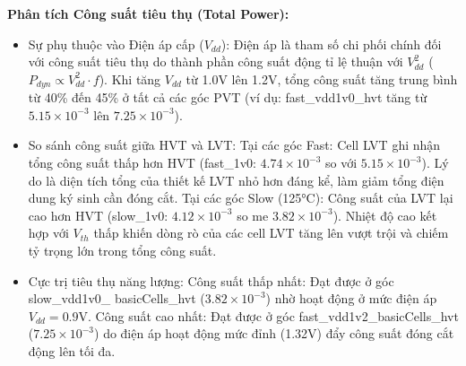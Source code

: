 \documentclass[12pt,a4paper,oneside]{book}
\begin{document}
\textbf{Phân tích Công suất tiêu thụ (Total Power):}
\begin{itemize}
    \item Sự phụ thuộc vào Điện áp cấp ($V_{dd}$): Điện áp là tham số chi phối chính đối với công suất tiêu thụ do thành phần công suất động tỉ lệ thuận với $V_{dd}^2$ ($P_{dyn} \propto V_{dd}^2 \cdot f$). Khi tăng $V_{dd}$ từ 1.0V lên 1.2V, tổng công suất tăng trung bình từ 40\% đến 45\% ở tất cả các góc PVT (ví dụ: fast\_vdd1v0\_hvt tăng từ $5.15 \times 10^{-3}$ lên $7.25 \times 10^{-3}$).
    \item So sánh công suất giữa HVT và LVT: Tại các góc Fast: Cell LVT ghi nhận tổng công suất thấp hơn HVT (fast\_1v0: $4.74 \times 10^{-3}$ so với $5.15 \times 10^{-3}$). Lý do là diện tích tổng của thiết kế LVT nhỏ hơn đáng kể, làm giảm tổng điện dung ký sinh cần đóng cắt. Tại các góc Slow (125°C): Công suất của LVT lại cao hơn HVT (slow\_1v0: $4.12 \times 10^{-3}$ so me $3.82 \times 10^{-3}$). Nhiệt độ cao kết hợp với $V_{th}$ thấp khiến dòng rò của các cell LVT tăng lên vượt trội và chiếm tỷ trọng lớn trong tổng công suất.
    \item Cực trị tiêu thụ năng lượng: Công suất thấp nhất: Đạt được ở góc slow\_vdd1v0\_ basicCells\_hvt ($3.82 \times 10^{-3}$) nhờ hoạt động ở mức điện áp $V_{dd} = 0.9\text{V}$. Công suất cao nhất: Đạt được ở góc fast\_vdd1v2\_basicCells\_hvt ($7.25 \times 10^{-3}$) do điện áp hoạt động mức đỉnh (1.32V) đẩy công suất đóng cắt động lên tối đa.
\end{itemize}
\newpage
\begin{table}[h]
\centering
{}
\caption{Bảng tổng hợp thông số timing các góc phân tích (PVT corners) cho khối min\_submin.}
\end{table}
\end{document}
